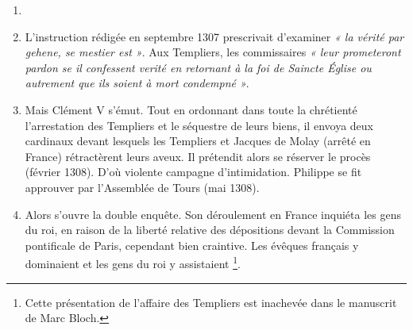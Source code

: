 \documentclass[french,twoside]{book} %
\newcommand\chapterclose{} %
\renewcommand\chapterclose{} %
\begin{document}
\begin{enumerate}[itemsep=\baselineskip,]
\item[] \hspace{-1.5em}{\bfseries Les phases sont :}
\item 
{}L’instruction rédigée en septembre 1307 prescrivait d’examiner \emph{« la vérité par gehene, se mestier est »}. Aux Templiers, les commissaires \emph{« leur prometeront pardon se il confessent verité en retornant à la foi de Saincte Église ou autrement que ils soient à mort condempné »}.

\item Mais Clément V s’émut. Tout en ordonnant dans toute la chrétienté l’arrestation des Templiers et le séquestre de leurs biens, il envoya deux cardinaux devant lesquels les Templiers et Jacques de Molay (arrêté en France) rétractèrent leurs aveux. Il prétendit alors se réserver le procès (février 1308). D’où violente campagne d’intimidation. Philippe se fit approuver par l’Assemblée de Tours (mai 1308).\par

\item Alors s’ouvre la double enquête. Son déroulement en France inquiéta les gens du roi, en raison de la liberté relative des dépositions devant la Commission pontificale de Paris, cependant bien craintive. Les évêques français y dominaient et les gens du roi y assistaient \footnote{Cette présentation de l’affaire des Templiers est inachevée dans le manuscrit de Marc Bloch.}.


\end{enumerate}\chapterclose
\end{document}
